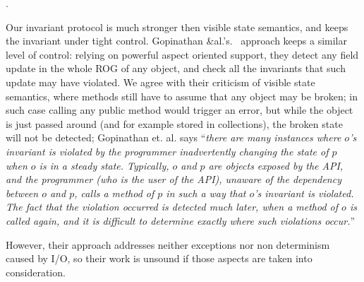 .

Our invariant protocol is much stronger then
visible state semantics, and keeps the invariant under tight control.
Gopinathan \&al.'s.~\cite{Gopinathan:2008:RMO:1483018.1483028} approach keeps
a similar level of control:
relying on powerful aspect oriented support, they detect any field update in the whole ROG of any object, and check all the invariants that such update may have violated.
We agree with their criticism of visible state semantics, where  methods still have to assume that any object may be broken; in such case calling any public method would trigger an error, but while the object is just passed around (and for example stored in collections), the broken state will not be detected; Gopinathan et. al. says ``\emph{there are many instances where $o$'s invariant is violated by the programmer inadvertently changing the state of $p$ when $o$ is in a steady state. Typically, $o$ and $p$ are objects exposed by the API, and the programmer (who is the user of the API), unaware of the dependency between $o$ and $p$, calls a method of $p$ in such a way that $o$'s invariant is violated. The fact that the violation occurred is detected much later, when a method of $o$ is called again, and it is difficult to determine exactly where such violations occur.}''

However, their approach addresses neither exceptions nor non determinism caused by I/O, so their work is unsound if those aspects are taken into consideration.

